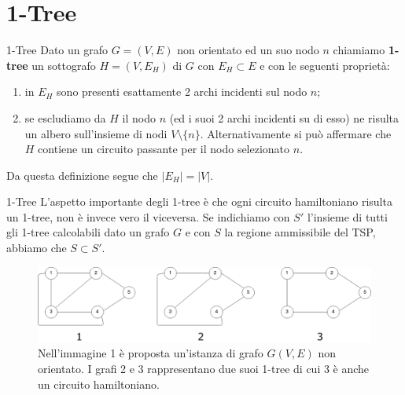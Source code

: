 \documentclass[10pt]{beamer}
\begin{document}
\section{1-Tree}
\begin{frame}{1-Tree}
    Dato un grafo $G=(V,E)$ non orientato ed un suo nodo $n$ chiamiamo \textbf{1-tree} un sottografo $H = (V, E_H)$ di $G$ con $E_H \subset E$ e con le seguenti proprietà:
    \begin{enumerate}
        \item in $E_H$ sono presenti esattamente 2 archi incidenti sul nodo $n$;
        \item se escludiamo da $H$ il nodo $n$ (ed i suoi 2 archi incidenti su di esso) ne risulta un albero sull'insieme di nodi $V \setminus \{n\}$. \newline Alternativamente si può affermare che $H$ contiene un circuito passante per il nodo selezionato $n$.
    \end{enumerate}
    Da questa definizione segue che $|E_H| = |V|$.
\end{frame}

\begin{frame}{1-Tree}
    L'aspetto importante degli 1-tree è che ogni circuito hamiltoniano risulta un 1-tree, non è invece vero il viceversa. Se indichiamo con $S'$ l'insieme di tutti gli 1-tree calcolabili dato un grafo $G$ e con $S$ la regione ammissibile del TSP, abbiamo che $S \subset S'$.
    
    \begin{figure}
        \centering
         \includegraphics[scale=0.21]{files/1TreeEsempi.png}
        \caption{Nell'immagine 1 è proposta un'istanza di grafo $G(V,E)$ non orientato. I grafi 2 e 3 rappresentano due suoi 1-tree di cui 3 è anche un circuito hamiltoniano.}
    \end{figure}
       
   
\end{frame}
\end{document}
